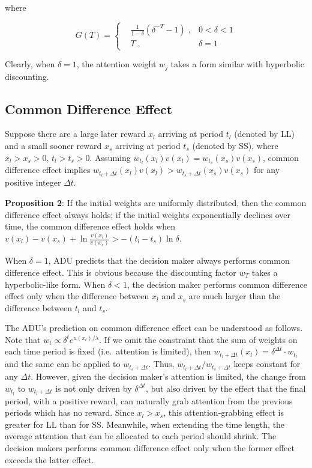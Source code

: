 \documentclass[
  12pt,
]{article}
\begin{document}
where

\[
G(T) = \left\{ \begin{aligned}
& \frac{1}{1-\delta}(\delta^{-T}-1) \; ,& 0<\delta<1\\
& T\; ,& \delta=1\
\end{aligned}
\right.
\]

Clearly, when \(\delta=1\), the attention weight \(w_j\) takes a form
similar with hyperbolic discounting.

\hypertarget{common-difference-effect}{%
\subsection{Common Difference Effect}\label{common-difference-effect}}

Suppose there are a large later reward \(x_l\) arriving at period
\(t_l\) (denoted by LL) and a small sooner reward \(x_s\) arriving at
period \(t_s\) (denoted by SS), where \(x_l>x_s>0\), \(t_l>t_s>0\).
Assuming \(w_{t_l}(x_l)v(x_l)=w_{t_s}(x_s)v(x_s)\), common difference
effect implies
\(w_{t_l+\Delta t}(x_l)v(x_l)>w_{t_s+\Delta t}(x_s)v(x_s)\) for any
positive integer \(\Delta t\)\citep{loewenstein_anomalies_1992}.

\textbf{Proposition 2}: If the initial weights are uniformly
distributed, then the common difference effect always holds; if the
initial weights exponentially declines over time, the common difference
effect holds when
\(v(x_l)-v(x_s)+\ln\frac{v(x_l)}{v(x_s)}>-(t_l-t_s)\ln\delta\).

When \(\delta = 1\), ADU predicts that the decision maker always
performs common difference effect. This is obvious because the
discounting factor \(w_T\) takes a hyperbolic-like form. When
\(\delta<1\), the decision maker performs common difference effect only
when the difference between \(x_l\) and \(x_s\) are much larger than the
difference between \(t_l\) and \(t_s\).

The ADU's prediction on common difference effect can be understood as
follows. Note that \(w_t \propto \delta^t e^{u(x_t)/\lambda}\). If we
omit the constraint that the sum of weights on each time period is fixed
(i.e.~attention is limited), then
\(w_{t_l+\Delta t}(x_l) = \delta^{\Delta t} \cdot w_{t_l}\) and the same
can be applied to \(w_{t_s+\Delta t}\). Thus,
\(w_{t_l+\Delta t} / w_{t_s+\Delta t}\) keeps constant for any
\(\Delta t\). However, given the decision maker's attention is limited,
the change from \(w_{t_l}\) to \(w_{t_l+\Delta t}\) is not only driven
by \(\delta^{\Delta t}\), but also driven by the effect that the final
period, with a positive reward, can naturally grab attention from the
previous periods which has no reward. Since \(x_l > x_s\), this
attention-grabbing effect is greater for LL than for SS. Meanwhile, when
extending the time length, the average attention that can be allocated
to each period should shrink. The decision makers performs common
difference effect only when the former effect exceeds the latter effect.
\end{document}
